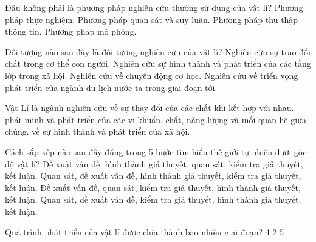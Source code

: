 \begin{ex}
Đâu không phải là phương pháp nghiên cứu thường sử dụng của vật lí?
\choice
{Phương pháp thực nghiệm.}
{Phương pháp quan sát và suy luận.}
{\True Phương pháp thu thập thông tin.}
{Phương pháp mô phỏng.}
\end{ex}

\begin{ex}
Đối tượng nào sau đây là đối tượng nghiên cứu của vật lí?
\choice
{Nghiên cứu sự trao đổi chất trong cơ thể con người.}
{Nghiên cứu sự hình thành và phát triển của các tầng lớp trong xã hội.}
{\True Nghiên cứu về chuyển động cơ học.}
{Nghiên cứu về triển vọng phát triển của ngành du lịch nước ta trong giai đoạn tới.}
\end{ex}

\begin{ex}
Vật Lí là ngành nghiên cứu về
\choice
{sự thay đổi của các chất khi kết hợp với nhau.}
{phát minh và phát triển của các vi khuẩn.}
{\True chất, năng lượng và mối quan hệ giữa chúng.}
{về sự hình thành và phát triển của xã hội.}
\end{ex}

\begin{ex}
Cách sắp xếp nào sau đây đúng trong 5 bước tìm hiểu thế giới tự nhiên dưới góc độ vật lí?
\choice
{Đề xuất vấn đề, hình thành giả thuyết, quan sát, kiểm tra giả thuyết, kết luận.}
{\True Quan sát, đề xuất vấn đề, hình thành giả thuyết, kiểm tra giả thuyết, kết luận.}
{Đề xuất vấn đề, quan sát, kiểm tra giả thuyết, hình thành giả thuyết, kết luận.}
{Quan sát, đề xuất vấn đề, kiểm tra giả thuyết, hình thành giả thuyết, kết luận.}
\end{ex}

\begin{ex}
Quá trình phát triển của vật lí được chia thành bao nhiêu giai đoạn? 
\choice
{}
{4}
{2}
{5}
\end{ex}

